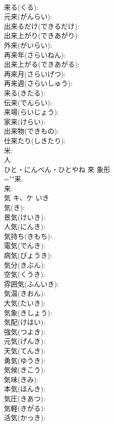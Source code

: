 \documentclass[8pt]{extreport}
\begin{document}
\begin{CJK}{UTF8}{min}
\\	来る(くる): 
\\	元来(がんらい): 
\\	出来るだけ(できるだけ): 
\\	出来上がり(できあがり): 
\\	外来(がいらい): 
\\	再来年(さらいねん): 
\\	出来上がる(できあがる): 
\\	再来月(さらいげつ): 
\\	再来週(さらいしゅう): 
\\	来る(きたる): 
\\	伝来(でんらい): 
\\	来場(らいじょう): 
\\	家来(けらい): 
\\	出来物(できもの): 
\\	仕来たり(しきたり): 
\\	米: 
\\	人	
\\	ひと・にんべん・ひとやね	來	象形 
\\	=""来.
\\	来.
\\	気	キ、ケ	いき		
\\	気(き): 
\\	景気(けいき): 
\\	人気(にんき): 
\\	気持ち(きもち): 
\\	電気(でんき): 
\\	病気(びょうき): 
\\	気分(きぶん): 
\\	空気(くうき): 
\\	雰囲気(ふんいき): 
\\	気温(きおん): 
\\	大気(たいき): 
\\	気象(きしょう): 
\\	気配(けはい): 
\\	強気(つよき): 
\\	元気(げんき): 
\\	天気(てんき): 
\\	勇気(ゆうき): 
\\	気候(きこう): 
\\	気味(きみ): 
\\	本気(ほんき): 
\\	気圧(きあつ): 
\\	気軽(きがる): 
\\	活気(かっき): 

\end{CJK}
\end{document}
